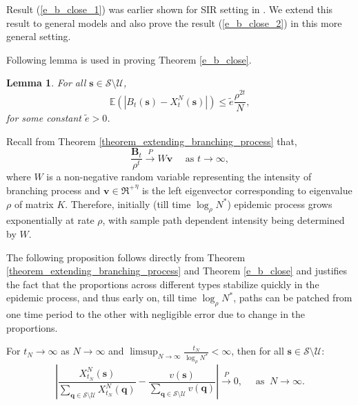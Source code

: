 \documentclass{article}
\newtheorem{lemma}{Lemma}[section]
\theoremstyle{definition}
\newcommand{\lrp}[1]{\left({#1}\right)}
\newcommand{\abs}[1]{\left\lvert{#1}\right\rvert}
\newcommand{\Exp}[1]{\mathbb{E}\lrp{#1}}
\begin{document}
 Result (\ref{e_b_close_1}) was earlier shown for SIR setting in \cite{epidemic_notes}. We extend this result to general models and also prove the result (\ref{e_b_close_2}) in this more general setting. 

Following lemma is used in proving Theorem \ref{e_b_close}.
\begin{lemma} For all $\bm{s}\in \mathcal S \setminus  \mathcal U$,
\[\Exp{\abs{{{B}}_t (\bm{s}) - {{X}}^N_t(\bm{s})}} \leq \tilde{e} \frac{\rho^{2t}}{N},\]
for some constant $\tilde{e}>0$.
\label{bounding_diff_lemma_final}
\end{lemma}


Recall from Theorem \ref{theorem_extending_branching_process} that, 
\[ \frac{\bm{B}_t}{\rho^t} \xrightarrow{P} W\bm{v} \quad \text{ as } t \to \infty,\] 
 where $W$ is a non-negative random variable representing the intensity of branching process and ${\bm{v}} \in {\Re^+}^{\eta}$ is the left eigenvector corresponding to eigenvalue $\rho$ of matrix $K$.
Therefore, initially (till time $\log_{\rho}N^*$) epidemic process grows exponentially at rate $\rho$, with sample path dependent intensity being determined by $W$.

 The following proposition follows directly from Theorem \ref{theorem_extending_branching_process} and Theorem \ref{e_b_close} and justifies the fact that the proportions across different types stabilize quickly in the epidemic process, and thus early on,
 till time $\log_{\rho} N^*$, 
 paths can be patched from one time period
 to the other with negligible error due to change in the proportions. 
 
 

 
\begin{proposition} For $t_N \rightarrow \infty$ as $N \rightarrow \infty$ and $\limsup_{N \rightarrow \infty}\frac{t_N}{\log_\rho N^*} 
< \infty$, then for all $\bm{s}\in \mathcal S \setminus  \mathcal U$: 
        \[ \left\lvert\frac{{X}_{t_N}^N(\bm{s})}{\sum_{\bm{q}\in \mathcal S \setminus  \mathcal U} {X}_{t_N}^N(\bm{q})} - \frac{{v}(\bm{s})}{\sum_{\bm{q}\in \mathcal S \setminus  \mathcal U} v(\bm{q})}\right\rvert \xrightarrow{P} 0, \quad \text{ as } ~N\rightarrow\infty. \]
        
\label{initial_proposition}
\end{proposition}
 
\end{document}
